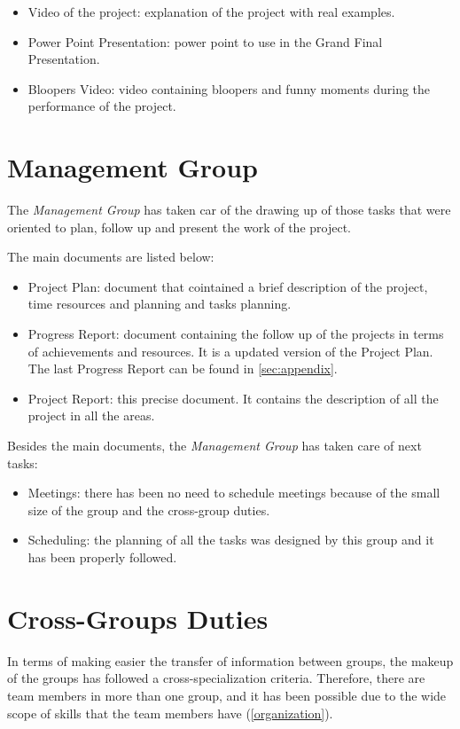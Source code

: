 \documentclass[11pt,a4paper,english]{book}  %
\theoremstyle{definition}  %
\theoremstyle{plain}  %
\theoremstyle{remark}  %
\begin{document}
\begin{itemize}
\item Video of the project: explanation of the project with real examples.
\item Power Point Presentation: power point to use in the Grand Final Presentation.
\item Bloopers Video: video containing bloopers and funny moments during the performance of the project.
\end{itemize}

	\section{Management Group}

The \textit{Management Group} has taken car of the drawing up of those tasks that were oriented to plan, follow up and present the work of the project.

The main documents are listed below:

\begin{itemize}
\item Project Plan: document that cointained a brief description of the project, time resources and planning and tasks planning.
\item Progress Report: document containing the follow up of the projects in terms of achievements and resources. It is a updated version of the Project Plan. The last Progress Report can be found in \ref{sec:appendix}.
\item Project Report: this precise document. It contains the description of all the project in all the areas.
\end{itemize}

Besides the main documents, the \textit{Management Group} has taken care of next tasks:

\begin{itemize}
\item Meetings: there has been no need to schedule meetings because of the small size of the group and the cross-group duties.
\item  Scheduling: the planning of all the tasks was designed by this group and it has been properly followed.
\end{itemize}


\section{Cross-Groups Duties}

In terms of making easier the transfer of information between groups, the makeup of the groups has followed a cross-specialization criteria. Therefore, there are team members in more than one group, and it has been possible due to the wide scope of skills that the team members have (\ref{organization}).
\end{document}
